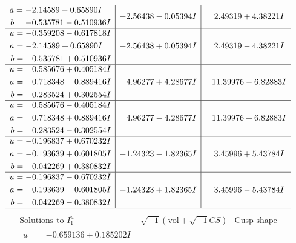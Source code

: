 \documentclass[1p]{elsarticle_modified}
\theoremstyle{definition}
\newcommand{\I}{\sqrt{-1}}
\begin{document}
$$\begin{array}{c|c|c}
\begin{aligned}
a &= -2.14589 - 0.65890 I \\
b &= -0.535781 - 0.510936 I\end{aligned}
 & -2.56438 - 0.05394 I & \phantom{-}2.49319 + 4.38221 I \\ \hline\begin{aligned}
u &= -0.359208 - 0.617818 I \\
a &= -2.14589 + 0.65890 I \\
b &= -0.535781 + 0.510936 I\end{aligned}
 & -2.56438 + 0.05394 I & \phantom{-}2.49319 - 4.38221 I \\ \hline\begin{aligned}
u &= \phantom{-}0.585676 + 0.405184 I \\
a &= \phantom{-}0.718348 - 0.889416 I \\
b &= \phantom{-}0.283524 + 0.302554 I\end{aligned}
 & \phantom{-}4.96277 + 4.28677 I & \phantom{-}11.39976 - 6.82883 I \\ \hline\begin{aligned}
u &= \phantom{-}0.585676 - 0.405184 I \\
a &= \phantom{-}0.718348 + 0.889416 I \\
b &= \phantom{-}0.283524 - 0.302554 I\end{aligned}
 & \phantom{-}4.96277 - 4.28677 I & \phantom{-}11.39976 + 6.82883 I \\ \hline\begin{aligned}
u &= -0.196837 + 0.670232 I \\
a &= -0.193639 + 0.601805 I \\
b &= \phantom{-}0.042269 + 0.380832 I\end{aligned}
 & -1.24323 - 1.82365 I & \phantom{-}3.45996 + 5.43784 I \\ \hline\begin{aligned}
u &= -0.196837 - 0.670232 I \\
a &= -0.193639 - 0.601805 I \\
b &= \phantom{-}0.042269 - 0.380832 I\end{aligned}
 & -1.24323 + 1.82365 I & \phantom{-}3.45996 - 5.43784 I\\
 \hline 
 \end{array}$$\newpage$$\begin{array}{c|c|c}  
\text{Solutions to }I^u_{1}& \I (\text{vol} + \sqrt{-1}CS) & \text{Cusp shape}\\
 \hline 
\begin{aligned}
u &= -0.659136 + 0.185202 I \\

\end{aligned}
\end{array}$$
\end{document}
